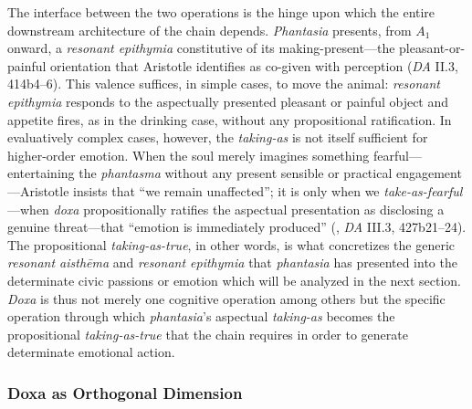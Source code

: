The interface between the two operations is the hinge upon which the entire downstream architecture of the chain depends. \textit{Phantasia} presents, from $A_1$ onward, a \textit{resonant epithymia} constitutive of its making-present---the pleasant-or-painful orientation that Aristotle identifies as co-given with perception (\textit{DA} II.3, 414b4--6). This valence suffices, in simple cases, to move the animal: \textit{resonant epithymia} responds to the aspectually presented pleasant or painful object and appetite fires, as in the drinking case, without any propositional ratification. In evaluatively complex cases, however, the \textit{taking-as} is not itself sufficient for higher-order emotion. When the soul merely imagines something fearful---entertaining the \textit{phantasma} without any present sensible or practical engagement---Aristotle insists that ``we remain unaffected''; it is only when we \textit{take-as-fearful}---when \textit{doxa} propositionally ratifies the aspectual presentation as disclosing a genuine threat---that ``emotion is immediately produced'' (, \textit{DA} III.3, 427b21--24). The propositional \textit{taking-as-true}, in other words, is what concretizes the generic \textit{resonant aisthēma} and \textit{resonant epithymia} that \textit{phantasia} has presented into the determinate civic passions or emotion which will be analyzed in the next section. \textit{Doxa} is thus not merely one cognitive operation among others but the specific operation through which \textit{phantasia}'s aspectual \textit{taking-as} becomes the propositional \textit{taking-as-true} that the chain requires in order to generate determinate emotional action.

\subsubsection*{Doxa as Orthogonal Dimension}

